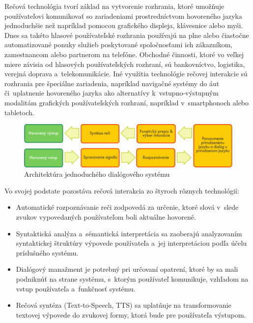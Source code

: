 \noindent Rečová technológia tvorí základ na vytvorenie rozhrania, ktoré umožňuje používateľovi komunikovať so zariadeniami prostredníctvom hovoreného jazyka jednoduchšie než napríklad pomocou grafického displeja, klávesnice alebo myši. Dnes sa takéto hlasové používateľské rozhrania používajú na plne alebo čiastočne automatizované ponuky služieb poskytované spoločnosťami ich zákazníkom, zamestnancom alebo partnerom na telefóne. Obchodné činnosti, ktoré vo veľkej miere závisia od hlasových používateľských rozhraní, sú bankovníctvo, logistika, verejná doprava a~telekomunikácie. Iné využitia technológie rečovej interakcie sú rozhrania pre špeciálne zariadenia, napríklad navigačné systémy do  áut či~uplatnenie hovoreného jazyka ako alternatívy k~vstupno-výstupným modalitám grafických používateľských rozhraní, napríklad v~smartphonoch alebo tabletoch. 

\begin{figure}[htb]
  \center
  \includegraphics[width=\textwidth]{../_media/slovak/simple_speech-based_dialogue_architecture}
  \caption{Architektúra jednoduchého dialógového systému}
  \label{fig:dialoguearch_sk}
\end{figure}

Vo svojej podstate pozostáva rečová interakcia zo štyroch rôznych technológií:

\begin{itemize}
\item Automatické rozpoznávanie reči zodpovedá za určenie, ktoré slová v~slede zvukov vypovedaných používateľom boli aktuálne hovorené.
\item Syntaktická analýza a~sémantická interpretácia sa zaoberajú analyzovaním syntaktickej štruktúry výpovede používateľa a~jej interpretáciou podľa účelu príslušného systému.
\item Dialógový manažment je potrebný pri určovaní opatrení, ktoré by sa mali podniknúť na strane systému, s~ktorým používateľ komunikuje, vzhľadom na vstup používateľa a~funkčnosť systému.
\item Rečová syntéza (Text-to-Speech, TTS) sa uplatňuje na transformovanie textovej výpovede do zvukovej formy, ktorá bude pre používateľa výstupom.
\end{itemize}

